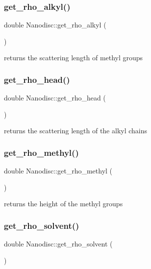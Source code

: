 \subsubsection{\texorpdfstring{get\_rho\_alkyl()}{get\_rho\_alkyl()}}
{\footnotesize\ttfamily double Nanodisc\+::get\+\_\+rho\+\_\+alkyl (\begin{DoxyParamCaption}{ }\end{DoxyParamCaption})}

returns the scattering length of methyl groups \mbox{\label{class_nanodisc_afcdab9b4cf99f623a486391e9fc77898}} 
\subsubsection{\texorpdfstring{get\_rho\_head()}{get\_rho\_head()}}
{\footnotesize\ttfamily double Nanodisc\+::get\+\_\+rho\+\_\+head (\begin{DoxyParamCaption}{ }\end{DoxyParamCaption})}

returns the scattering length of the alkyl chains \mbox{\label{class_nanodisc_ae80f727607e9a220c1a31b830f42225e}} 
\subsubsection{\texorpdfstring{get\_rho\_methyl()}{get\_rho\_methyl()}}
{\footnotesize\ttfamily double Nanodisc\+::get\+\_\+rho\+\_\+methyl (\begin{DoxyParamCaption}{ }\end{DoxyParamCaption})}

returns the height of the methyl groups \mbox{\label{class_nanodisc_a03753ced50590244f40bf39658437308}} 
\subsubsection{\texorpdfstring{get\_rho\_solvent()}{get\_rho\_solvent()}}
{\footnotesize\ttfamily double Nanodisc\+::get\+\_\+rho\+\_\+solvent (\begin{DoxyParamCaption}{ }\end{DoxyParamCaption})}

